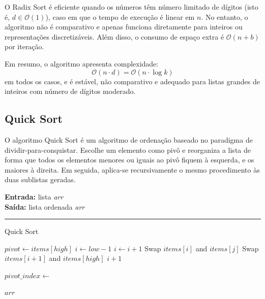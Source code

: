 \documentclass[conference]{IEEEtran}
\begin{document}
O Radix Sort é eficiente quando os números têm número limitado de dígitos (isto é, \( d \in \mathcal{O}(1) \)), caso em que o tempo de execução é linear em \( n \). No entanto, o algoritmo não é comparativo e apenas funciona diretamente para inteiros ou representações discretizáveis. Além disso, o consumo de espaço extra é \(\mathcal{O}(n + b)\) por iteração.

Em resumo, o algoritmo apresenta complexidade:
\[
\mathcal{O}(n \cdot d) = \mathcal{O}(n \cdot \log k)
\]
em todos os casos, e é estável, não comparativo e adequado para listas grandes de inteiros com número de dígitos moderado.


\subsection{Quick Sort}

O algoritmo Quick Sort é um algoritmo de ordenação baseado no paradigma de dividir-para-conquistar. Escolhe um elemento como pivô e reorganiza a lista de forma que todos os elementos menores ou iguais ao pivô fiquem à esquerda, e os maiores à direita. Em seguida, aplica-se recursivamente o mesmo procedimento às duas sublistas geradas.

\begin{algorithm}[H]
    \raggedright
    \vspace{.1em}
    \textbf{Entrada:} lista \textit{arr} \\
    \textbf{Saída:} lista ordenada \textit{arr} \\
    \vspace{.5em}
    \hrule 
    \caption{Quick Sort}
    \begin{algorithmic}[1]
            \State $pivot \gets items[high]$
            \State $i \gets low - 1$
                    \State $i \gets i + 1$
                    \State Swap $items[i]$ and $items[j]$
                \EndIf
            \EndFor
            \State Swap $items[i + 1]$ and $items[high]$
            \State \Return $i + 1$
        \EndFunction
    
                \State $pivot\_index \gets$ 
                \State {}
                \State {}
            \EndIf
        \EndFunction
    
        \State {}
        \State \Return $arr$
    \end{algorithmic}
\end{algorithm}
\end{document}
